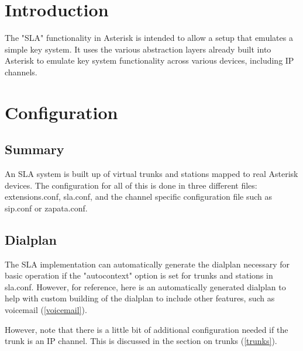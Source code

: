 

%


\section{Introduction}

The "SLA" functionality in Asterisk is intended to allow a setup that emulates
a simple key system.  It uses the various abstraction layers already built into
Asterisk to emulate key system functionality across various devices, including
IP channels.

\section{Configuration}

\subsection{Summary}

An SLA system is built up of virtual trunks and stations mapped to real
Asterisk devices.  The configuration for all of this is done in three
different files: extensions.conf, sla.conf, and the channel specific
configuration file such as sip.conf or zapata.conf.

\subsection{Dialplan}

The SLA implementation can automatically generate the dialplan necessary for
basic operation if the "autocontext" option is set for trunks and stations in
sla.conf.  However, for reference, here is an automatically generated dialplan
to help with custom building of the dialplan to include other features, such as
voicemail (\ref{voicemail}).

However, note that there is a little bit of additional configuration needed if
the trunk is an IP channel.  This is discussed in the section on trunks (\ref{trunks}).

